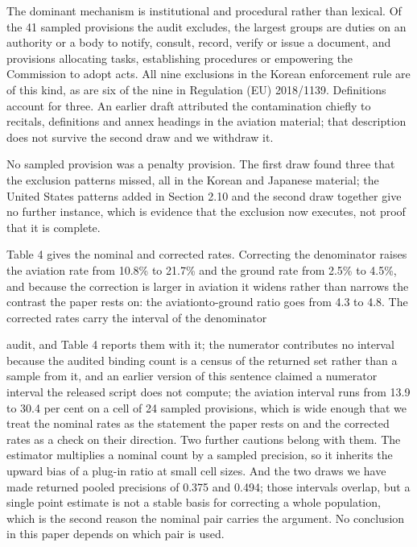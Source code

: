 The dominant mechanism is institutional and procedural rather than lexical. Of the 41 sampled provisions the audit excludes, the largest groups are duties on an authority or a body to notify, consult, record, verify or issue a document, and provisions allocating tasks, establishing procedures or empowering the Commission to adopt acts. All nine exclusions in the Korean enforcement rule are of this kind, as are six of the nine in Regulation (EU) 2018/1139. Definitions account for three. An earlier draft attributed the contamination chiefly to recitals, definitions and annex headings in the aviation material; that description does not survive the second draw and we withdraw it.

No sampled provision was a penalty provision. The first draw found three that the exclusion patterns missed, all in the Korean and Japanese material; the United States patterns added in Section 2.10 and the second draw together give no further instance, which is evidence that the exclusion now executes, not proof that it is complete.

Table 4 gives the nominal and corrected rates. Correcting the denominator raises the aviation rate from 10.8\% to 21.7\% and the ground rate from 2.5\% to 4.5\%, and because the correction is larger in aviation it widens rather than narrows the contrast the paper rests on: the aviationto-ground ratio goes from 4.3 to 4.8. The corrected rates carry the interval of the denominator

audit, and Table 4 reports them with it; the numerator contributes no interval because the audited binding count is a census of the returned set rather than a sample from it, and an earlier version of this sentence claimed a numerator interval the released script does not compute; the aviation interval runs from 13.9 to 30.4 per cent on a cell of 24 sampled provisions, which is wide enough that we treat the nominal rates as the statement the paper rests on and the corrected rates as a check on their direction. Two further cautions belong with them. The estimator multiplies a nominal count by a sampled precision, so it inherits the upward bias of a plug-in ratio at small cell sizes. And the two draws we have made returned pooled precisions of 0.375 and 0.494; those intervals overlap, but a single point estimate is not a stable basis for correcting a whole population, which is the second reason the nominal pair carries the argument. No conclusion in this paper depends on which pair is used.

